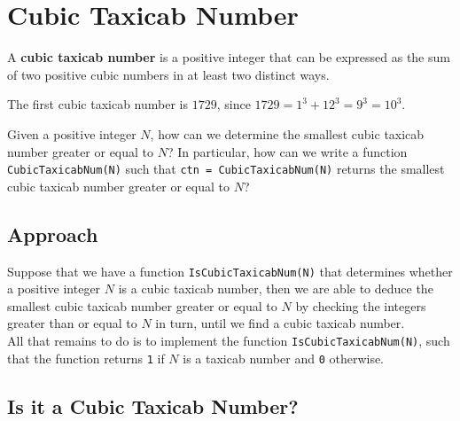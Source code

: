 \section{Cubic Taxicab Number}
\begin{definition}
	A \textbf{cubic taxicab number} is a positive integer that can be expressed as the sum of two positive cubic numbers in at least two distinct ways.
\end{definition}

\begin{example}
	The first cubic taxicab number is $1729$, since $1729 = 1^3 + 12^3 = 9^3 = 10^3$.
\end{example}

\begin{problem}
	Given a positive integer $N$, how can we determine the smallest cubic taxicab number greater or equal to $N$? In particular, how can we write a function \lstinline|CubicTaxicabNum(N)| such that \lstinline|ctn = CubicTaxicabNum(N)| returns the smallest cubic taxicab number greater or equal to $N$?
\end{problem}


\subsection{Approach}
Suppose that we have a function \lstinline|IsCubicTaxicabNum(N)| that determines whether a positive integer $N$ is a cubic taxicab number, then we are able to deduce the smallest cubic taxicab number greater or equal to $N$ by checking the integers greater than or equal to $N$ in turn, until we find a cubic taxicab number.\\



\noindent
All that remains to do is to implement the function \lstinline|IsCubicTaxicabNum(N)|, such that the function returns \lstinline|1| if $N$ is a taxicab number and \lstinline|0| otherwise.

\newpage
\subsection{Is it a Cubic Taxicab Number?}

